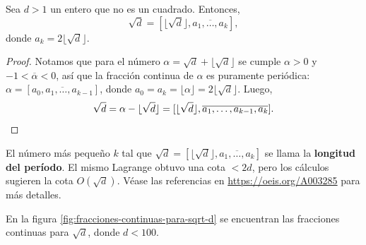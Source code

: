 \begin{corolario}
  Sea $d > 1$ un entero que no es un cuadrado. Entonces,
  $$\sqrt{d} = [\lfloor\sqrt{d}\rfloor, \overline{a_1,\ldots,a_k}],$$
  donde $a_k = 2\lfloor\sqrt{d}\rfloor$.

  \begin{proof}
    Notamos que para el número $\alpha = \sqrt{d} + \lfloor\sqrt{d}\rfloor$
    se cumple $\alpha > 0$ y $-1 < \overline{\alpha} < 0$, así que la fracción
    continua de $\alpha$ es puramente periódica:
    $\alpha = [\overline{a_0,a_1,\ldots,a_{k-1}}]$,
    donde $a_0 = a_k = \lfloor\alpha\rfloor = 2\lfloor\sqrt{d}\rfloor$. Luego,
    \[ \sqrt{d} = \alpha - \lfloor\sqrt{d}\rfloor =
       [\lfloor\sqrt{d}\rfloor, \overline{a_1,\ldots,a_{k-1},a_k}]. \qedhere \]
  \end{proof}
\end{corolario}

\begin{comentario}
  El número más pequeño $k$ tal que
  $\sqrt{d} = [\lfloor\sqrt{d}\rfloor, \overline{a_1,\ldots,a_k}]$ se llama la
  \textbf{longitud del período}. El mismo Lagrange obtuvo una cota $< 2d$,
  pero los cálculos sugieren la cota $O (\sqrt{d})$. Véase las referencias en
  \url{https://oeis.org/A003285} para más detalles.
\end{comentario}

En la figura \ref{fig:fracciones-continuas-para-sqrt-d} se encuentran las
fracciones continuas para $\sqrt{d}$, donde $d < 100$.


